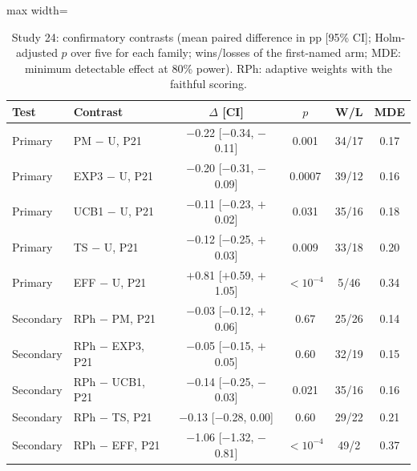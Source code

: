 \begin{table}[t]
\caption{Study 24: confirmatory contrasts (mean paired difference in pp [95\% CI]; Holm-adjusted $p$ over five for each family; wins/losses of the first-named arm; MDE: minimum detectable effect at 80\% power). RPh: adaptive weights with the faithful scoring.}\label{tab:s24f}
\centering
\small
\begin{adjustbox}{max width=\linewidth}
\begin{tabular}{llcccc}
\toprule
Test & Contrast & $\Delta$ [CI] & $p$ & W/L & MDE \\
\midrule
Primary & PM $-$ U, P21 & $-$0.22 [$-$0.34, $-$0.11] & 0.001 & 34/17 & 0.17 \\
Primary & EXP3 $-$ U, P21 & $-$0.20 [$-$0.31, $-$0.09] & 0.0007 & 39/12 & 0.16 \\
Primary & UCB1 $-$ U, P21 & $-$0.11 [$-$0.23, $+$0.02] & 0.031 & 35/16 & 0.18 \\
Primary & TS $-$ U, P21 & $-$0.12 [$-$0.25, $+$0.03] & 0.009 & 33/18 & 0.20 \\
Primary & EFF $-$ U, P21 & $+$0.81 [$+$0.59, $+$1.05] & \ensuremath{<10^{-4}} & 5/46 & 0.34 \\
Secondary & RPh $-$ PM, P21 & $-$0.03 [$-$0.12, $+$0.06] & 0.67 & 25/26 & 0.14 \\
Secondary & RPh $-$ EXP3, P21 & $-$0.05 [$-$0.15, $+$0.05] & 0.60 & 32/19 & 0.15 \\
Secondary & RPh $-$ UCB1, P21 & $-$0.14 [$-$0.25, $-$0.03] & 0.021 & 35/16 & 0.16 \\
Secondary & RPh $-$ TS, P21 & $-$0.13 [$-$0.28, 0.00] & 0.60 & 29/22 & 0.21 \\
Secondary & RPh $-$ EFF, P21 & $-$1.06 [$-$1.32, $-$0.81] & \ensuremath{<10^{-4}} & 49/2 & 0.37 \\
\bottomrule
\end{tabular}
\end{adjustbox}
\end{table}
